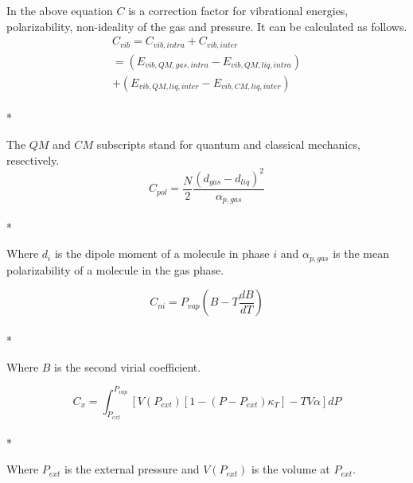 \documentclass[aps,pre,nofootinbib,superscriptaddress,linenumbers,10pt, draft,tightenlines]{revtex4-1}
\begin{document}
\begin{itemize}
\begin{itemize}
    	In the above equation $C$ is a correction factor for vibrational energies, polarizability, non-ideality of the gas and pressure. It can be calculated as follows.
    	\begin{multline}
    	C_{vib} = C_{vib,intra} + C_{vib,inter} \\ = \left(E_{vib,QM,gas,intra} - E_{vib,QM,liq,intra}\right) \\ + \left(E_{vib,QM,liq,inter} - E_{vib,CM,liq,inter}\right)
    	\end{multline}\\*
    	
    	The $QM$ and $CM$ subscripts stand for quantum and classical mechanics, resectively. 
    	\begin{equation}C_{pol} = \frac{N}{2} \frac{\left(d_{gas} - d_{liq}\right)^2}{\alpha_{p,gas}}\end{equation}\\*
    	
    	Where $d_i$ is the dipole moment of a molecule in phase $i$ and $\alpha_{p,gas}$ is the mean polarizability of a molecule in the gas phase.
    	
    	\begin{equation}C_{ni} = P_{vap} \left(B - T \frac{dB}{dT}\right)\end{equation}\\*
    	
    	Where $B$ is the second virial coefficient.
    	
    	\begin{equation}C_x = \int_{P_{ext}}^{P_{vap}} \left[V\left(P_{ext}\right)\left[1 - \left(P - P_{ext}\right) \kappa_T\right] - T V \alpha\right] dP\end{equation}\\*
    	
    	Where $P_{ext}$ is the external pressure and $V\left(P_{ext}\right)$ is the volume at $P_{ext}$. 
    	

\end{itemize}
\end{itemize}
\end{document}
